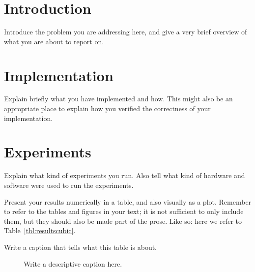 \documentclass[11pt, a4paper]{article}
\begin{document}
\section{Introduction}

Introduce the problem you are addressing here, and give a very brief
overview of what you are about to report on.

\section{Implementation}

Explain briefly what you have implemented and how. This might also be
an appropriate place to explain how you verified the correctness of
your implementation.

\section{Experiments}

Explain what kind of experiments you run. Also tell what kind of
hardware and software were used to run the experiments.

Present your results numerically in a table, and also visually as a
plot. Remember to refer to the tables and figures in your text; it is
not sufficient to only include them, but they should also be made part
of the prose. Like so: here we refer to Table~\ref{tbl:resultscubic}.

\begin{table}[h]
  \begin{center}
  \caption{Write a caption that tells what this table is about.}
  \label{tbl:resultscubic}
  \end{center}
\end{table}

\begin{figure}[h]
  \begin{center}
    \caption{Write a descriptive caption here.}
    \label{fig:runtimes}
  \end{center}
\end{figure}

\newpage


\end{document}
